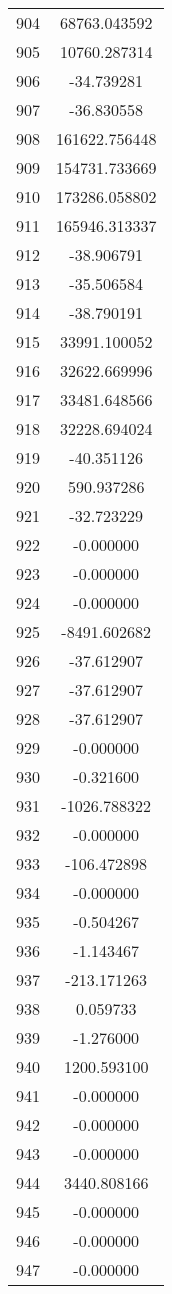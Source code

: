 \documentclass[12pt]{article}
\begin{document}
\begin{longtable}{@{}cc@{}}
904 & 68763.043592 \\
905 & 10760.287314 \\
906 & -34.739281 \\
907 & -36.830558 \\
908 & 161622.756448 \\
909 & 154731.733669 \\
910 & 173286.058802 \\
911 & 165946.313337 \\
912 & -38.906791 \\
913 & -35.506584 \\
914 & -38.790191 \\
915 & 33991.100052 \\
916 & 32622.669996 \\
917 & 33481.648566 \\
918 & 32228.694024 \\
919 & -40.351126 \\
920 & 590.937286 \\
921 & -32.723229 \\
922 & -0.000000 \\
923 & -0.000000 \\
924 & -0.000000 \\
925 & -8491.602682 \\
926 & -37.612907 \\
927 & -37.612907 \\
928 & -37.612907 \\
929 & -0.000000 \\
930 & -0.321600 \\
931 & -1026.788322 \\
932 & -0.000000 \\
933 & -106.472898 \\
934 & -0.000000 \\
935 & -0.504267 \\
936 & -1.143467 \\
937 & -213.171263 \\
938 & 0.059733 \\
939 & -1.276000 \\
940 & 1200.593100 \\
941 & -0.000000 \\
942 & -0.000000 \\
943 & -0.000000 \\
944 & 3440.808166 \\
945 & -0.000000 \\
946 & -0.000000 \\
947 & -0.000000 \\

\end{longtable}
\end{document}
